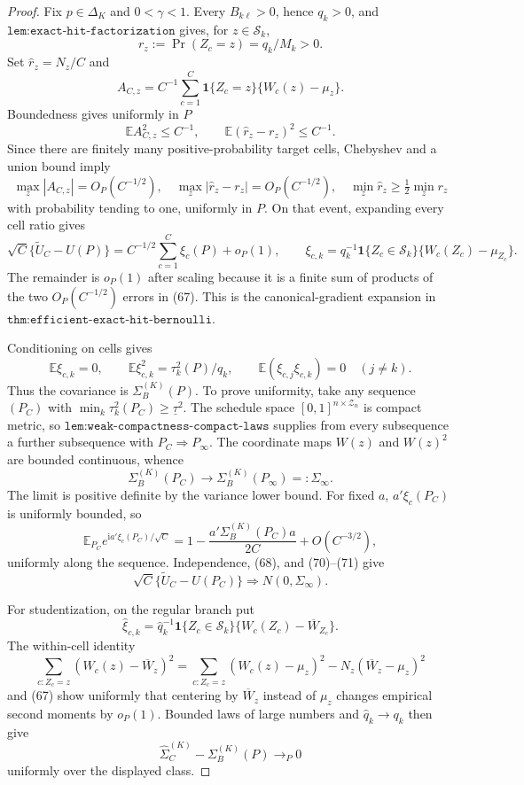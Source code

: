 \documentclass{article}
\begin{document}
\begin{proof}
Fix \(p\in\Delta_K\) and \(0<\gamma<1\).  Every \(B_{k\ell}>0\), hence \(q_k>0\), and \(\texttt{lem:exact-hit-factorization}\) gives, for \(z\in\mathcal S_k\),
\[
r_z:=\Pr(Z_c=z)=q_k/M_k>0. \tag{66}
\]
Set \(\widehat r_z=N_z/C\) and
\[
A_{C,z}=C^{-1}\sum_{c=1}^C\mathbf1\{Z_c=z\}\{W_c(z)-\mu_z\}.
\]
Boundedness gives uniformly in \(P\)
\[
\mathbb EA_{C,z}^2\leq C^{-1},\qquad
\mathbb E(\widehat r_z-r_z)^2\leq C^{-1}. \tag{67}
\]
Since there are finitely many positive-probability target cells, Chebyshev and a union bound imply
\[
\max_z|A_{C,z}|=O_P(C^{-1/2}),\quad
\max_z|\widehat r_z-r_z|=O_P(C^{-1/2}),\quad
\min_z\widehat r_z\geq\tfrac12\min_zr_z
\]
with probability tending to one, uniformly in \(P\).  On that event, expanding every cell ratio gives
\[
\sqrt C\{\widetilde U_C-U(P)\}
=C^{-1/2}\sum_{c=1}^C\xi_c(P)+o_P(1),\qquad
\xi_{c,k}=q_k^{-1}\mathbf1\{Z_c\in\mathcal S_k\}
\{W_c(Z_c)-\mu_{Z_c}\}. \tag{68}
\]
The remainder is \(o_P(1)\) after scaling because it is a finite sum of products of the two \(O_P(C^{-1/2})\) errors in (67).  This is the canonical-gradient expansion in \(\texttt{thm:efficient-exact-hit-bernoulli}\).

Conditioning on cells gives
\[
\mathbb E\xi_{c,k}=0,\qquad
\mathbb E\xi_{c,k}^2=\tau_k^2(P)/q_k,\qquad
\mathbb E(\xi_{c,j}\xi_{c,k})=0\quad(j\ne k). \tag{69}
\]
Thus the covariance is \(\Sigma_B^{(K)}(P)\).  To prove uniformity, take any sequence \((P_C)\) with \(\min_k\tau_k^2(P_C)\geq\underline\tau^2\).  The schedule space \([0,1]^{n\times\mathcal Z_n}\) is compact metric, so \(\texttt{lem:weak-compactness-compact-laws}\) supplies from every subsequence a further subsequence with \(P_C\Rightarrow P_\infty\).  The coordinate maps \(W(z)\) and \(W(z)^2\) are bounded continuous, whence
\[
\Sigma_B^{(K)}(P_C)\longrightarrow\Sigma_B^{(K)}(P_\infty)=:\Sigma_\infty. \tag{70}
\]
The limit is positive definite by the variance lower bound.  For fixed \(a\), \(a'\xi_c(P_C)\) is uniformly bounded, so
\[
\mathbb E_{P_C}e^{\mathrm ia'\xi_c(P_C)/\sqrt C}
=1-\frac{a'\Sigma_B^{(K)}(P_C)a}{2C}+O(C^{-3/2}), \tag{71}
\]
uniformly along the sequence.  Independence, (68), and (70)--(71) give
\[
\sqrt C\{\widetilde U_C-U(P_C)\}\Rightarrow N(0,\Sigma_\infty). \tag{72}
\]

For studentization, on the regular branch put
\[
\widehat\xi_{c,k}=\widehat q_k^{-1}\mathbf1\{Z_c\in\mathcal S_k\}
\{W_c(Z_c)-\overline W_{Z_c}\}.
\]
The within-cell identity
\[
\sum_{c:Z_c=z}(W_c(z)-\overline W_z)^2
=\sum_{c:Z_c=z}(W_c(z)-\mu_z)^2-N_z(\overline W_z-\mu_z)^2
\]
and (67) show uniformly that centering by \(\overline W_z\) instead of \(\mu_z\) changes empirical second moments by \(o_P(1)\).  Bounded laws of large numbers and \(\widehat q_k\to q_k\) then give
\[
\widehat\Sigma_C^{(K)}-\Sigma_B^{(K)}(P)\to_P0 \tag{73}
\]
uniformly over the displayed class.


\end{proof}
\end{document}
